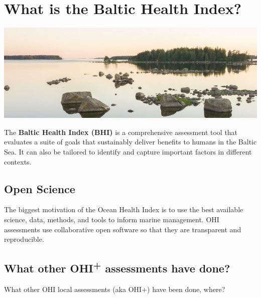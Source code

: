 \documentclass[
]{book}
\begin{document}
\hypertarget{what-is-the-baltic-health-index}{%
\chapter{What is the Baltic Health Index?}\label{what-is-the-baltic-health-index}}

\begin{center}\includegraphics[width=800px]{_book/_main_files/figure-html/banner-image-rocks} \end{center}

The \textbf{Baltic Health Index (BHI)} is a comprehensive assessment tool that evaluates a suite of goals that sustainably deliver benefits to humans in the Baltic Sea. It can also be tailored to identify and capture important factors in different contexts.

\hypertarget{open-science}{%
\section*{Open Science}\label{open-science}}

The biggest motivation of the Ocean Health Index is to use the best available science, data, methods, and tools to inform marine management. OHI assessments use collaborative open software so that they are transparent and reproducible.

\hypertarget{what-other-ohi-assessments-have-done}{%
\section*{\texorpdfstring{What other OHI\textsuperscript{+} assessments have done?}{What other OHI+ assessments have done?}}\label{what-other-ohi-assessments-have-done}}

What other OHI local assessments (aka OHI+) have been done, where?
\end{document}
